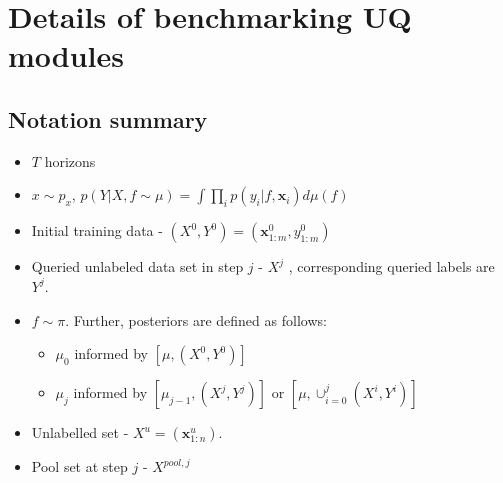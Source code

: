 \section{Details of benchmarking UQ modules} \label{sec:details-benchmark-UQ}







\subsection{Notation summary}
\begin{itemize}
    \item $T$ horizons
    \item $x \sim p_x$, $p(Y|X,f\sim\mu) = \int \prod_{i} p(y_i|f,{\mathbf x_i}) d\mu(f)$
    \item Initial training data - $(X^0,Y^0) =({\mathbf x}_{1:m}^0,y_{1:m}^0)$
    \item Queried unlabeled data set in step $j$ - $X^j$ , corresponding queried labels  are $Y^j$. 

    \item $f \sim \pi$. Further, posteriors are defined as follows:
\begin{itemize}
    \item  $\mu_0$ informed by $[\mu, (X^0,Y^0)]$ 
    \item  $\mu_j$ informed by $[\mu_{j-1}, (X^j,Y^j) ]$ or $[\mu, \cup_{i=0}^{j}(X^i,Y^i)]$
\end{itemize}
   

    \item Unlabelled set - $X^u = ({\mathbf x}_{1:n}^{u}) $.
    \item Pool set at step $j$ - $X^{pool, j}$
    
\end{itemize}


